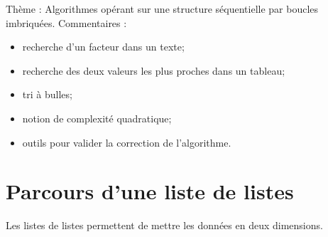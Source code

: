 \documentclass[t,10pt]{article}
\begin{document}
\enteteinfo


\bigskip

Thème : Algorithmes opérant sur une structure séquentielle par boucles imbriquées. 
Commentaires :
\begin{itemize}
\item recherche d'un facteur dans un texte;
\item recherche des deux valeurs les plus proches dans un tableau;
\item tri à bulles;
\item notion de complexité quadratique;
\item outils pour valider la correction de l'algorithme.
\end{itemize}


\section{Parcours d'une liste de listes}
Les listes de listes permettent de mettre les données en deux dimensions. 
\end{document}
